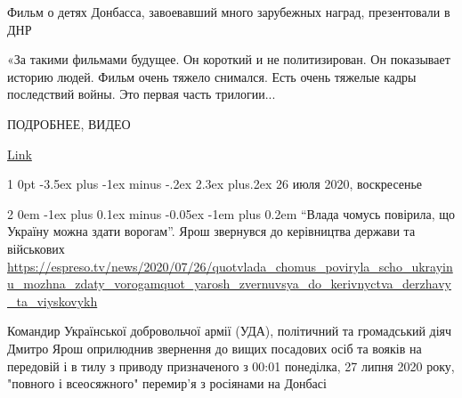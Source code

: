\documentclass[a4paper,11pt]{extreport}
\makeatletter
\renewcommand\section{%
  \clearpage
  \@startsection{section}%
    {1}%
    {0pt}%
    {-3.5ex plus -1ex minus -.2ex}%
    {2.3ex plus.2ex}%
    {\centering\normalfont\Huge\bfseries}%
}
\renewcommand\subsection{%
  \clearpage
    \@startsection{subsection}%
    {2}%
    {0em}%
    {-1ex plus 0.1ex minus -0.05ex}%
    {-1em plus 0.2em}%
    {\scshape\bfseries\Large}%
}
\makeatother
\begin{document}

Фильм о детях Донбасса, завоевавший много зарубежных наград, презентовали в ДНР

«За такими фильмами будущее. Он короткий и не политизирован. Он показывает
историю людей. Фильм очень тяжело снимался. Есть очень тяжелые кадры
последствий войны. Это первая часть трилогии...

ПОДРОБНЕЕ, ВИДЕО

\href{https://l.facebook.com/l.php?u=https%
}{Link}
  
 
 
  
\clearpage
\section{26 июля 2020, воскресенье}
\label{sec:26_07_2020}


 
 
  
\subsection{``Влада чомусь повірила, що Україну можна здати ворогам''. Ярош звернувся до керівництва держави та військових}
\label{sec:26_07_2020.news.ua.1}
\url{https://espreso.tv/news/2020/07/26/quotvlada_chomus_poviryla_scho_ukrayinu_mozhna_zdaty_vorogamquot_yarosh_zvernuvsya_do_kerivnyctva_derzhavy_ta_viyskovykh}

  
Командир Української добровольчої армії (УДА), політичний та громадський діяч
Дмитро Ярош оприлюднив звернення до вищих посадових осіб та вояків на передовій
і в тилу з приводу призначеного з 00:01 понеділка, 27 липня 2020 року, "повного
і всеосяжного" перемир’я з росіянами на Донбасі 
\end{document}
